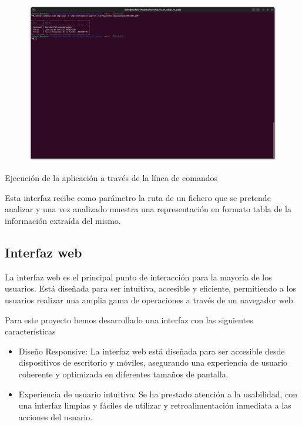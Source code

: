 \begin{figure}
    \centering
    \includegraphics{./chapter/4/images/ad_4nxfdnwjsbh2gjzl1fmziayn8lryh5kzvpjg_3lhrv86rpzq87figcfwvjn3ilyfhdd3auhqjpie927ftvvbjujd4ezcsa-qi}
    \caption{}
    \label{fig:ad_4nxfdnwjsbh2gjzl1fmziayn8lryh5kzvpjg_3lhrv86rpzq87figcfwvjn3ilyfhdd3auhqjpie927ftvvbjujd4ezcsa-qi}
\end{figure}

Ejecución de la aplicación a través de la línea de comandos

Esta interfaz recibe como parámetro la ruta de un fichero que se pretende analizar y una vez analizado muestra una representación en formato tabla de la información extraída del mismo.

\subsection*{Interfaz web}
La interfaz web es el principal punto de interacción para la mayoría de los usuarios. Está diseñada para ser intuitiva, accesible y eficiente, permitiendo a los usuarios realizar una amplia gama de operaciones a través de un navegador web.

Para este proyecto hemos desarrollado una interfaz con las siguientes características

\begin{itemize}
    \item Diseño Responsive: La interfaz web está diseñada para ser accesible desde dispositivos de escritorio y móviles, asegurando una experiencia de usuario coherente y optimizada en diferentes tamaños de pantalla.
    \item Experiencia de usuario intuitiva: Se ha prestado atención a la usabilidad, con una interfaz limpias y fáciles de utilizar y retroalimentación inmediata a las acciones del usuario.
\end{itemize}

